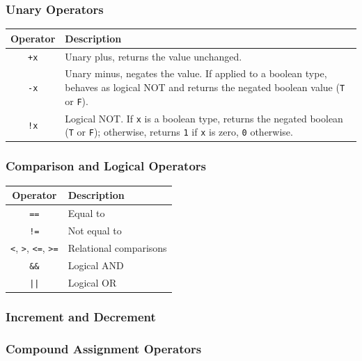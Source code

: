 \subsubsection{Unary Operators}

\begin{center}
\begin{tabular}{|c|p{11cm}|}
\hline
\textbf{Operator} & \textbf{Description} \\
\hline
\texttt{+x}  & Unary plus, returns the value unchanged. \\
\texttt{-x}  & Unary minus, negates the value. If applied to a boolean type, behaves as logical 
NOT and returns the negated boolean value (\texttt{T} or \texttt{F}). \\
\texttt{!x}  & Logical NOT. If \texttt{x} is a boolean type, returns the negated boolean (\texttt{T} 
or \texttt{F}); otherwise, returns \texttt{1} if \texttt{x} is zero, \texttt{0} otherwise. \\
\hline
\end{tabular}
\end{center}

\subsubsection{Comparison and Logical Operators}

\begin{center}
\begin{tabular}{|c|l|}
\hline
\textbf{Operator} & \textbf{Description} \\
\hline
\texttt{==}               & Equal to \\
\texttt{!=}               & Not equal to \\
\texttt{<}, \texttt{>}, \texttt{<=}, \texttt{>=} & Relational comparisons \\
\texttt{\&\&}             & Logical AND \\
\texttt{||}               & Logical OR \\
\hline
\end{tabular}
\end{center}

\subsubsection{Increment and Decrement}



\subsubsection{Compound Assignment Operators}

